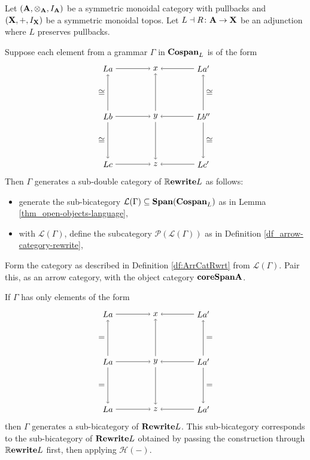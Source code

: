 \documentclass[master]{subfiles}
\begin{document}
\begin{thm} \label{thm_}
	Let $ (\mathbf{A} , \otimes_{\mathbf{A}} , I_{\mathbf{A}}) $ be a symmetric monoidal category with pullbacks and $ (\mathbf{X} , + , I_{\mathbf{X}}) $ be a symmetric monoidal topos.  Let $ L \dashv R \colon \mathbf{A} \to \mathbf{X} $ be an adjunction where $ L $ preserves pullbacks.
 	
	Suppose each element from a grammar $ \Gamma $ in $ \mathbf{Cospan}_L $ is of the form 
 	\[
 	\begin{tikzpicture}
 	\node (a) at (-1,1) {$ L a $};
 	\node (x) at (1,1) {$ x $};
 	\node (a') at (3,1) {$ L a' $};
 	\node (b) at (-1,-1) {$ L b $};
 	\node (y) at (1,-1) {$ y $};
 	\node (b') at (3,-1) {$ L b'' $};
 	\node (c) at (-1,-3) {$ L c $};
 	\node (z) at (1,-3) {$ z $};
 	\node (c') at (3,-3) {$ L c' $};
 	\draw [->] (a) to (x);
 	\draw [->] (a') to (x);
 	\draw [->] (b) to (y);
 	\draw [->] (b') to (y);
 	\draw [->] (c) to (z);
 	\draw [->] (c') to (z);
 	\draw [->] (b) to node [left] {$ \cong $} (a);
 	\draw [->] (b) to node [left] {$ \cong $} (c);
 	\draw [->] (y) to (x);
 	\draw [->] (y) to (z);
 	\draw [->] (b') to node [right] {$ \cong $} (a');
 	\draw [->] (b') to node [right] {$ \cong $} (c');
 	\end{tikzpicture}
 	\]
 	Then $ \Gamma $ generates a sub-double category of $ \mathbb{R}\mathbf{ewrite}{L} $ as follows:
 	\begin{itemize}
 		\item generate the sub-bicategory $ \mathcal{L}(\Gamma)  \subseteq \mathbf{Span} ( \mathbf{Cospan}_L )  $ as in Lemma \ref{thm_open-objects-language}, 
 		\item with $ \mathcal{L}(\Gamma) $, define the subcategory $ \mathcal{P}(\mathcal{L}(\Gamma)) $ as in Definition \ref{df_arrow-category-rewrite},
 	\end{itemize}  
 	
 	Form the category as described in Definition \ref{df:ArrCatRwrt} from $ \mathcal{L}(\Gamma) $. Pair this, as an arrow category, with the object category $ \mathbf{core}{\mathbf{Span}{\mathbf{A}}} $.  
\end{thm}
 
\begin{thm}
If $ \Gamma $ has only elements of the form 
\[
\begin{tikzpicture}
 	\node (a) at (-1,1) {$ L a $};
 	\node (x) at (1,1) {$ x $};
 	\node (a') at (3,1) {$ L a' $};
 	\node (b) at (-1,-1) {$ L a $};
 	\node (y) at (1,-1) {$ y $};
 	\node (b') at (3,-1) {$ L a' $};
 	\node (c) at (-1,-3) {$ L a $};
 	\node (z) at (1,-3) {$ z $};
 	\node (c') at (3,-3) {$ L a' $};
 	\draw [->] (a) to (x);
 	\draw [->] (a') to (x);
 	\draw [->] (b) to (y);
 	\draw [->] (b') to (y);
 	\draw [->] (c) to (z);
 	\draw [->] (c') to (z);
 	\draw [->] (b) to node [left] {$ = $} (a);
 	\draw [->] (b) to node [left] {$ = $} (c);
 	\draw [->] (y) to (x);
 	\draw [->] (y) to (z);
 	\draw [->] (b') to node [right] {$ = $} (a');
 	\draw [->] (b') to node [right] {$ = $} (c');
 	\end{tikzpicture}
 	\]
then $ \Gamma $ generates a sub-bicategory of $ \mathbf{Rewrite}{L} $.  This sub-bicategory corresponds to the sub-bicategory of $ \mathbf{Rewrite}{L} $ obtained by passing the construction through $ \mathbb{R}\mathbf{ewrite}{L} $ first, then applying $ \mathcal{H}(-) $.  
\end{thm}
 
\end{document}
